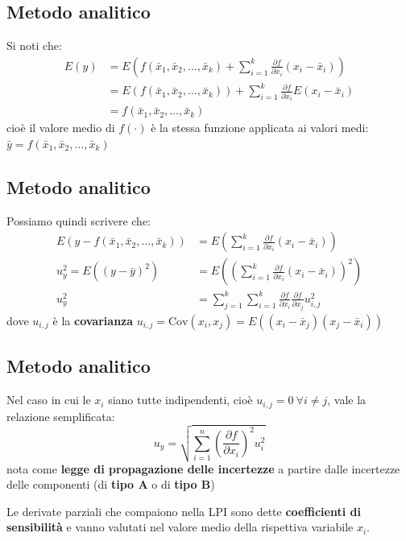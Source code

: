 \documentclass[
  letterpaper,
  DIV=11,
  numbers=noendperiod,
  oneside]{scrartcl}
\begin{document}
\subsection{Metodo analitico}\label{metodo-analitico-1}

Si noti che:
\begin{align}
E(y) &= E\left(f(\bar x_1, \bar x_2, \dots, \bar x_k) + \sum_{i=1}^k \frac{\partial f}{\partial x_i} (x_i - \bar x_i)\right) \\
&= E(f(\bar x_1, \bar x_2, \dots, \bar x_k)) + \sum_{i=1}^k \frac{\partial f}{\partial x_i} E(x_i - \bar x_i) \\
&= f(\bar x_1, \bar x_2, \dots, \bar x_k)
\end{align}
cioè il valore medio di \(f(\cdot)\) è la stessa funzione applicata ai
valori medi: \(\bar y=f(\bar x_1, \bar x_2,\dots,\bar x_k)\)

\subsection{Metodo analitico}\label{metodo-analitico-2}

Possiamo quindi scrivere che:
\begin{align}
E(y - f(\bar x_1, \bar x_2, \dots, \bar x_k)) &= E\left(\sum_{i=1}^k \frac{\partial f}{\partial x_i} (x_i - \bar x_i) \right) \\
u^2_y=E((y-\bar y)^2) &= E\left(\left(\sum_{i=1}^k \frac{\partial f}{\partial x_i}(x_i - \bar x_i)\right)^2\right) \\
u_y^2 &= \sum_{j=1}^k\sum_{i=1}^k \frac{\partial f}{\partial x_i}\frac{\partial f}{\partial x_j}u_{i,j}^2
\end{align}
dove \(u_{i,j}\) è la \textbf{covarianza}
\(u_{i,j}=\textrm{Cov}(x_i, x_j)=E((x_i-\bar x_j)(x_j - \bar x_i))\)

\subsection{Metodo analitico}\label{metodo-analitico-3}

Nel caso in cui le \(x_i\) siano tutte indipendenti, cioè
\(u_{i,j}=0~\forall i\neq j\), vale la relazione semplificata: \[
u_y = \sqrt{\sum_{i=1}^n \left(\frac{\partial f}{\partial x_i}\right)^2 u_i^2}
\] nota come \textbf{legge di propagazione delle incertezze} a partire
dalle incertezze delle componenti (di \textbf{tipo A} o di \textbf{tipo
B})

Le derivate parziali che compaiono nella LPI sono dette
\textbf{coefficienti di sensibilità} e vanno valutati nel valore medio
della rispettiva variabile \(x_i\).
\end{document}
